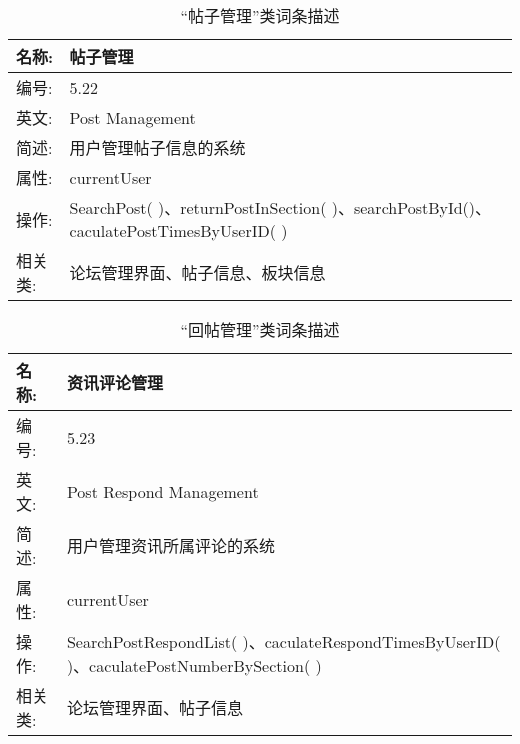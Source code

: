 \begin{table}[H]  
\caption{“帖子管理”类词条描述}  
\begin{center}  
    \begin{tabular}{l p{11cm}} 
        \hline
        \quad 名称:  & 帖子管理 \\
        \hline
        \quad 编号:  & 5.22 \\
        \hline
        \quad 英文:  &  Post Management\\
        \hline
        \quad 简述:  & 用户管理帖子信息的系统 \\
        \hline
        \quad 属性:  & currentUser \\
        \hline
        \quad 操作:  & SearchPost( )、returnPostInSection( )、searchPostById()、caculatePostTimesByUserID( )\\
        \hline
        \quad 相关类: & 论坛管理界面、帖子信息、板块信息\\
        \hline
    \end{tabular}
\end{center}
\end{table}

\begin{table}[H]  
\caption{“回帖管理”类词条描述}  
\begin{center}  
    \begin{tabular}{l p{11cm}} 
        \hline
        \quad 名称:  & 资讯评论管理 \\
        \hline
        \quad 编号:  & 5.23 \\
        \hline
        \quad 英文:  &  Post Respond Management\\
        \hline
        \quad 简述:  & 用户管理资讯所属评论的系统 \\
        \hline
        \quad 属性:  & currentUser \\
        \hline
        \quad 操作:  & SearchPostRespondList( )、caculateRespondTimesByUserID( )、caculatePostNumberBySection( ) \\
        \hline
        \quad 相关类: & 论坛管理界面、帖子信息\\
        \hline
    \end{tabular}
\end{center}
\end{table}


